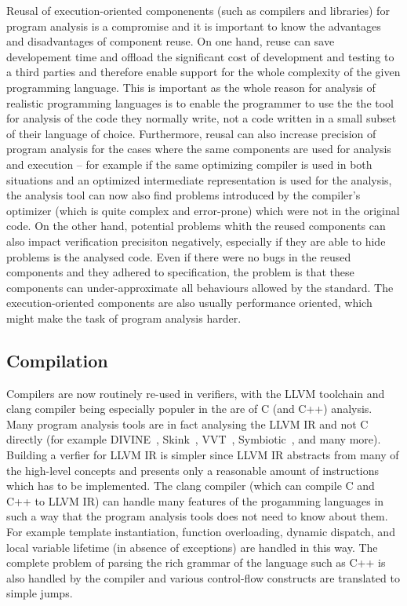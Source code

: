 Reusal of execution-oriented componenents (such as compilers and libraries) for
program analysis is a compromise and it is important to know the advantages and
disadvantages of component reuse.
On one hand, reuse can save developement time and offload the significant cost
of development and testing to a third parties and therefore enable support for the whole complexity of the given programming language.
This is important as the whole reason for analysis of realistic programming languages is to enable the programmer to use the the tool for analysis of the code they normally write, not a code written in a small subset of their language of choice.
Furthermore, reusal can also increase precision of program analysis for the cases where the same components are used for analysis and execution -- for example if the same optimizing compiler is used in both situations and an optimized intermediate representation is used for the analysis, the analysis tool can now also find problems introduced by the compiler's optimizer (which is quite complex and error-prone) which were not in the original code.
On the other hand, potential problems whith the reused components can also
impact verification precisiton negatively, especially if they are able to hide
problems is the analysed code.
Even if there were no bugs in the reused components and they adhered to specification, the problem is that these components can under-approximate all behaviours allowed by the standard.
The execution-oriented components are also usually performance oriented, which might make the task of program analysis harder.

\subsection{Compilation}

Compilers are now routinely re-used in verifiers, with the LLVM toolchain and
clang compiler being especially populer in the are of C (and C++) analysis.
Many program analysis tools are in fact analysing the LLVM IR and not C
directly (for example DIVINE~\cite{DIVINEToolPaper2017},
Skink~\cite{Cassez2017}, VVT~\cite{Gunther2016}, Symbiotic~\cite{Chalupa2018},
and many more).
Building a verfier for LLVM IR is simpler since LLVM IR abstracts from many of
the high-level concepts and presents only a reasonable amount of instructions
which has to be implemented.
The clang compiler (which can compile C and C++ to LLVM IR) can handle many
features of the progamming languages in such a way that the program analysis
tools does not need to know about them.
For example template instantiation, function overloading, dynamic dispatch, and
local variable lifetime (in absence of exceptions) are handled in this way.
The complete problem of parsing the rich grammar of the language such as C++ is
also handled by the compiler and various control-flow constructs are translated
to simple jumps.

